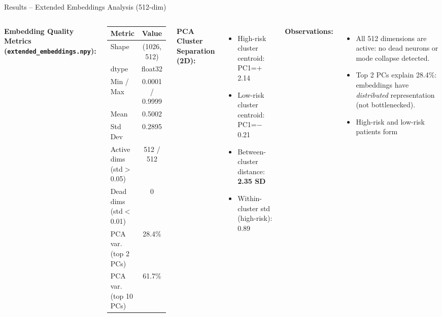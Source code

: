 \documentclass[aspectratio=169]{beamer}
\begin{document}
\begin{frame}{Results -- Extended Embeddings Analysis (512-dim)}
  \begin{columns}[T]
      \textbf{Embedding Quality Metrics (\texttt{extended\_embeddings.npy}):}
      \begin{center}\small
      \begin{tabular}{@{}lc@{}}
        \toprule
        \textbf{Metric} & \textbf{Value} \\
        \midrule
        Shape               & (1026, 512) \\
        dtype               & float32 \\
        Min / Max           & 0.0001 / 0.9999 \\
        Mean                & 0.5002 \\
        Std Dev             & 0.2895 \\
        Active dims (std$>$0.05) & 512 / 512 \\
        Dead dims (std$<$0.01)   & 0 \\
        PCA var. (top 2 PCs) & 28.4\% \\
        PCA var. (top 10 PCs) & 61.7\% \\
        \bottomrule
      \end{tabular}
      \end{center}
      \textbf{PCA Cluster Separation (2D):}
      \begin{itemize}\small
        \item High-risk cluster centroid: PC1=$+$2.14
        \item Low-risk cluster centroid: PC1=$-$0.21
        \item Between-cluster distance: \textbf{2.35 SD}
        \item Within-cluster std (high-risk): 0.89
      \end{itemize}
      \textbf{Observations:}
      \begin{itemize}\small
        \item All 512 dimensions are active:
              no dead neurons or mode collapse detected.
        \item Top 2 PCs explain 28.4\%: embeddings have
              \emph{distributed} representation (not bottlenecked).
        \item High-risk and low-risk patients form

\end{itemize}
\end{columns}
\end{frame}
\end{document}
